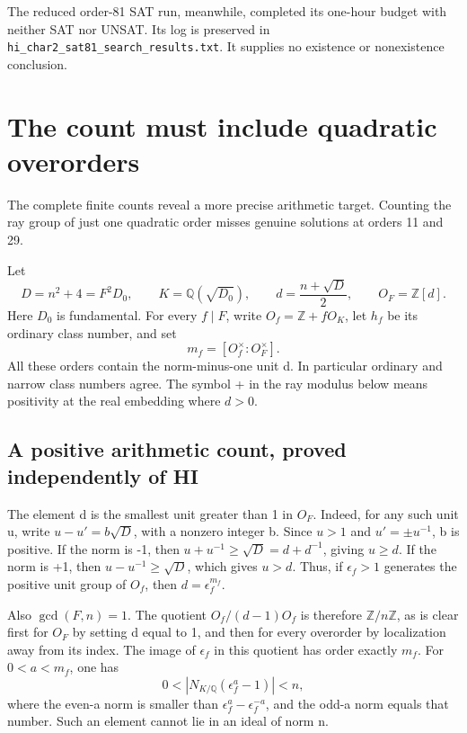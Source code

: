 \documentclass[11pt,reqno]{amsart}
\theoremstyle{plain}
\begin{document}
The reduced order-81 SAT run, meanwhile, completed its one-hour
budget with neither SAT nor UNSAT. Its log is preserved in
\texttt{hi\_\allowbreak char2\_\allowbreak sat81\_\allowbreak search\_\allowbreak results.txt}. It supplies no existence or
nonexistence conclusion.

\section{The count must include quadratic overorders}\label{sec:73}

The complete finite counts reveal a more precise arithmetic target.
Counting the ray group of just one quadratic order misses genuine
solutions at orders 11 and 29.

Let
\[
 D=n^2+4=F^2D_0,\qquad
 K=\mathbb Q(\sqrt{D_0}),\qquad
 d=\frac{n+\sqrt D}{2},\qquad O_F=\mathbb Z[d].
\]
Here \(D_0\) is fundamental. For every \(f\mid F\), write
\(O_f=\mathbb Z+fO_K\), let \(h_f\) be its ordinary class
number, and set
\[
 m_f=[O_f^\times:O_F^\times].
\]
All these orders contain the norm-minus-one unit d. In particular
ordinary and narrow class numbers agree.
The symbol + in the ray modulus below means positivity at the
real embedding where \(d>0\).

\subsection{A positive arithmetic count, proved independently of HI}\label{sec:73.1}

The element d is the smallest unit greater than 1 in \(O_F\).
Indeed, for any such unit u, write
\(u-u'=b\sqrt D\), with a nonzero integer b. Since \(u>1\)
and \(u'=\pm u^{-1}\), b is positive. If the norm is -1, then
\(u+u^{-1}\ge\sqrt D=d+d^{-1}\), giving \(u\ge d\).
If the norm is +1, then \(u-u^{-1}\ge\sqrt D\), which gives
\(u>d\). Thus, if \(\epsilon_f>1\) generates the positive
unit group of \(O_f\), then \(d=\epsilon_f^{m_f}\).

Also \(\gcd(F,n)=1\). The quotient
\(O_f/(d-1)O_f\) is therefore \(\mathbb Z/n\mathbb Z\),
as is clear first for \(O_F\) by setting d equal to 1, and
then for every overorder by localization away from its index.
The image of \(\epsilon_f\) in this quotient has order exactly
\(m_f\). For \(0<a<m_f\), one has
\[
 0<\left|N_{K/\mathbb Q}(\epsilon_f^a-1)\right|<n,
\]
where the even-a norm is smaller than
\(\epsilon_f^a-\epsilon_f^{-a}\), and the odd-a norm equals
that number. Such an element cannot lie in an ideal of norm n.
\end{document}
